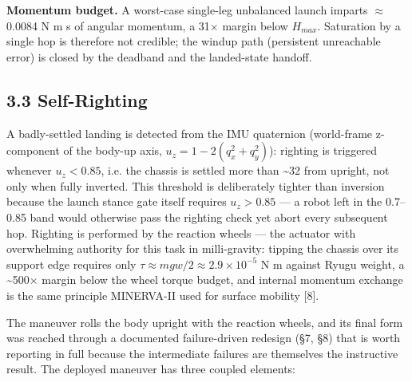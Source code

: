\documentclass[conference]{IEEEtran}
\begin{document}
\textbf{Momentum budget.} A worst-case single-leg unbalanced launch imparts \ensuremath{\approx}0.0084 N\,\textperiodcentered\,m\,\textperiodcentered\,s of angular momentum, a 31\ensuremath{\times} margin below $H_{max}$. Saturation by a single hop is therefore not credible; the windup path (persistent unreachable error) is closed by the deadband and the landed-state handoff.

\subsection*{3.3 Self-Righting}

A badly-settled landing is detected from the IMU quaternion (world-frame z-component of the body-up axis, $u_z = 1 - 2(q_x^2 + q_y^2)$): righting is triggered whenever $u_z < 0.85$, i.e. the chassis is settled more than \textasciitilde{}32\textdegree{} from upright, not only when fully inverted. This threshold is deliberately tighter than inversion because the launch stance gate itself requires $u_z > 0.85$ --- a robot left in the 0.7--0.85 band would otherwise pass the righting check yet abort every subsequent hop. Righting is performed by the reaction wheels --- the actuator with overwhelming authority for this task in milli-gravity: tipping the chassis over its support edge requires only $\tau \approx mgw/2 \approx 2.9\times10^{-5}$ N\,\textperiodcentered\,m against Ryugu weight, a \textasciitilde{}500\ensuremath{\times} margin below the wheel torque budget, and internal momentum exchange is the same principle MINERVA-II used for surface mobility [8].

The maneuver rolls the body upright with the reaction wheels, and its final form was reached through a documented failure-driven redesign (\S7, \S8) that is worth reporting in full because the intermediate failures are themselves the instructive result. The deployed maneuver has three coupled elements:
\end{document}
